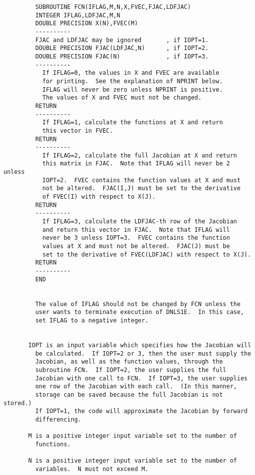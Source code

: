 \begin{verbatim}
         SUBROUTINE FCN(IFLAG,M,N,X,FVEC,FJAC,LDFJAC)
         INTEGER IFLAG,LDFJAC,M,N
         DOUBLE PRECISION X(N),FVEC(M)
         ----------
         FJAC and LDFJAC may be ignored       , if IOPT=1.
         DOUBLE PRECISION FJAC(LDFJAC,N)      , if IOPT=2.
         DOUBLE PRECISION FJAC(N)             , if IOPT=3.
         ----------
           If IFLAG=0, the values in X and FVEC are available
           for printing.  See the explanation of NPRINT below.
           IFLAG will never be zero unless NPRINT is positive.
           The values of X and FVEC must not be changed.
         RETURN
         ----------
           If IFLAG=1, calculate the functions at X and return
           this vector in FVEC.
         RETURN
         ----------
           If IFLAG=2, calculate the full Jacobian at X and return
           this matrix in FJAC.  Note that IFLAG will never be 2 unless
           IOPT=2.  FVEC contains the function values at X and must
           not be altered.  FJAC(I,J) must be set to the derivative
           of FVEC(I) with respect to X(J).
         RETURN
         ----------
           If IFLAG=3, calculate the LDFJAC-th row of the Jacobian
           and return this vector in FJAC.  Note that IFLAG will
           never be 3 unless IOPT=3.  FVEC contains the function
           values at X and must not be altered.  FJAC(J) must be
           set to the derivative of FVEC(LDFJAC) with respect to X(J).
         RETURN
         ----------
         END


         The value of IFLAG should not be changed by FCN unless the
         user wants to terminate execution of DNLS1E.  In this case,
         set IFLAG to a negative integer.


       IOPT is an input variable which specifies how the Jacobian will
         be calculated.  If IOPT=2 or 3, then the user must supply the
         Jacobian, as well as the function values, through the
         subroutine FCN.  If IOPT=2, the user supplies the full
         Jacobian with one call to FCN.  If IOPT=3, the user supplies
         one row of the Jacobian with each call.  (In this manner,
         storage can be saved because the full Jacobian is not stored.)
         If IOPT=1, the code will approximate the Jacobian by forward
         differencing.

       M is a positive integer input variable set to the number of
         functions.

       N is a positive integer input variable set to the number of
         variables.  N must not exceed M.


\end{verbatim}
